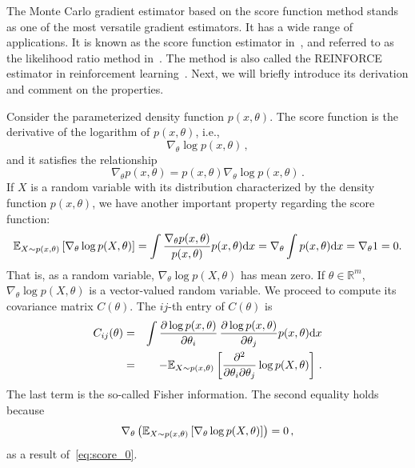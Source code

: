\documentclass[12pt]{amsart}
\newcommand{\bbR}{\mathbb R} \newcommand{\bbS}{\mathbb S}
\newcommand{\rd}{\mathrm{d}}
\begin{document}
The Monte Carlo gradient estimator based on the score function method stands as one of the most versatile gradient estimators. It has a wide range of applications. It is known as the score function estimator in~\cite{rubinstein1986score,kleijnen1996optimization}, and referred to as the likelihood ratio method in~\cite{glynn1990likelihood}. The method is also called the REINFORCE estimator in reinforcement learning~\cite{williams1992simple}. Next, we will briefly introduce its derivation and comment on the properties.


Consider the parameterized density function $p(x,\theta)$. The score function is the derivative of the logarithm of $p(x,\theta)$, i.e.,
\begin{equation}\label{eq:score_def}
    \nabla_\theta  \log p(x,\theta)\,,
\end{equation}
and it satisfies the relationship
\begin{equation}\label{eq:score}
\nabla_\theta p(x,\theta) = p(x,\theta) \nabla_\theta  \log p(x,\theta) \,.
\end{equation}
If $X$ is a random variable with its distribution characterized by the density function $p(x,\theta)$, we have
another important property regarding the score function:
\begin{equation}\label{eq:score_0}
    \bbE_{X\sim p(x,\theta)} \left[ \nabla_\theta  \log p(X,\theta) \right] = \int \frac{\nabla_\theta p(x,\theta) }{p(x,\theta)} p(x,\theta) \rd x = \nabla_\theta \int  p(x,\theta) \rd x = \nabla_\theta 1 = 0.
\end{equation}
That is, as a random variable, $ \nabla_\theta  \log p(X,\theta)$ has mean zero. If $\theta \in \bbR^m$, $\nabla_\theta  \log p(X,\theta) $ is a vector-valued random variable.
We proceed to compute its covariance matrix $C(\theta)$. The $ij$-th entry of $C(\theta)$ is
\begin{eqnarray}
   C_{ij}(\theta) &=& \int  \frac{\partial \log p(x,\theta) }{\partial \theta_i}   \,\frac{\partial \log p(x,\theta) }{\partial \theta_j}   p(x,\theta)\rd x \nonumber   \\
   &=&   - \bbE_{X\sim p(x,\theta) }\left[ \frac{\partial^2}{\partial \theta_i \partial\theta_j} \log   p(X,\theta)  \right]\,.
   \label{eq:score_var} 
\end{eqnarray}
The last term is the so-called Fisher information. The second equality holds because $$\nabla_\theta \left(  \mathbb E_{X\sim p(x,\theta)} \left[ \nabla_\theta  \log p(X,\theta) \right]  \right) = 0\,,$$
as a result of~\eqref{eq:score_0}.
\end{document}
